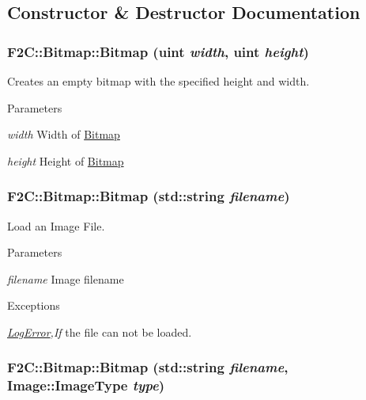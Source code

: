\subsection{Constructor \& Destructor Documentation}
\hypertarget{class_f2_c_1_1_bitmap_a8e61f5101f6303564a679fd582051fe9}{
\subsubsection[{Bitmap}]{\setlength{\rightskip}{0pt plus 5cm}F2C::Bitmap::Bitmap ({\bf uint} {\em width}, \/  {\bf uint} {\em height})}}
\label{class_f2_c_1_1_bitmap_a8e61f5101f6303564a679fd582051fe9}


Creates an empty bitmap with the specified height and width. 
\begin{DoxyParams}{Parameters}
\item[{\em width}]Width of \hyperlink{class_f2_c_1_1_bitmap}{Bitmap} \item[{\em height}]Height of \hyperlink{class_f2_c_1_1_bitmap}{Bitmap} \end{DoxyParams}
\hypertarget{class_f2_c_1_1_bitmap_a2fc3db9e8487a8826b5e2105963aad14}{
\subsubsection[{Bitmap}]{\setlength{\rightskip}{0pt plus 5cm}F2C::Bitmap::Bitmap (std::string {\em filename})}}
\label{class_f2_c_1_1_bitmap_a2fc3db9e8487a8826b5e2105963aad14}


Load an Image File. 
\begin{DoxyParams}{Parameters}
\item[{\em filename}]Image filename \end{DoxyParams}

\begin{DoxyExceptions}{Exceptions}
\item[{\em \hyperlink{class_f2_c_1_1_log_error}{LogError},If}]the file can not be loaded. \end{DoxyExceptions}
\hypertarget{class_f2_c_1_1_bitmap_a89985844df7be6208ab82f479d7f0957}{
\subsubsection[{Bitmap}]{\setlength{\rightskip}{0pt plus 5cm}F2C::Bitmap::Bitmap (std::string {\em filename}, \/  Image::ImageType {\em type})}}
\label{class_f2_c_1_1_bitmap_a89985844df7be6208ab82f479d7f0957}


